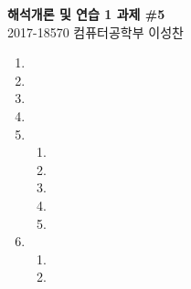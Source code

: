 \documentclass[11pt]{report}
\begin{document}
\begin{center}
\textbf{\Large 해석개론 및 연습 1 과제 \#5}\\
\large 2017-18570 컴퓨터공학부 이성찬
\end{center}
\begin{enumerate}
\item 

\item 
\item 
\item 
\item 
\begin{enumerate}
	\item \item 
	\item 
	\item 
	\item 
\end{enumerate}

\item 
\begin{enumerate}
	\item \item 
\end{enumerate}
\end{enumerate}
\end{document}
